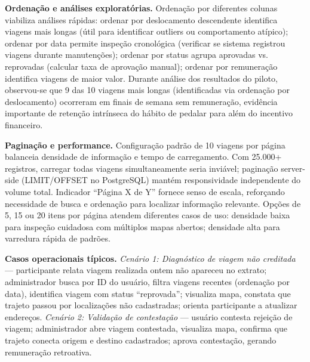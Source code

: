 \textbf{Ordenação e análises exploratórias.} Ordenação por diferentes colunas viabiliza análises rápidas: ordenar por deslocamento descendente identifica viagens mais longas (útil para identificar outliers ou comportamento atípico); ordenar por data permite inspeção cronológica (verificar se sistema registrou viagens durante manutenções); ordenar por status agrupa aprovadas vs. reprovadas (calcular taxa de aprovação manual); ordenar por remuneração identifica viagens de maior valor. Durante análise dos resultados do piloto, observou-se que 9 das 10 viagens mais longas (identificadas via ordenação por deslocamento) ocorreram em finais de semana sem remuneração, evidência importante de retenção intrínseca do hábito de pedalar para além do incentivo financeiro.

\textbf{Paginação e performance.} Configuração padrão de 10 viagens por página balanceia densidade de informação e tempo de carregamento. Com 25.000+ registros, carregar todas viagens simultaneamente seria inviável; paginação server-side (LIMIT/OFFSET no PostgreSQL) mantém responsividade independente do volume total. Indicador ``Página X de Y'' fornece senso de escala, reforçando necessidade de busca e ordenação para localizar informação relevante. Opções de 5, 15 ou 20 itens por página atendem diferentes casos de uso: densidade baixa para inspeção cuidadosa com múltiplos mapas abertos; densidade alta para varredura rápida de padrões.

\textbf{Casos operacionais típicos.} \textit{Cenário 1: Diagnóstico de viagem não creditada} --- participante relata viagem realizada ontem não apareceu no extrato; administrador busca por ID do usuário, filtra viagens recentes (ordenação por data), identifica viagem com status ``reprovada''; visualiza mapa, constata que trajeto passou por localizações não cadastradas; orienta participante a atualizar endereços. \textit{Cenário 2: Validação de contestação} --- usuário contesta rejeição de viagem; administrador abre viagem contestada, visualiza mapa, confirma que trajeto conecta origem e destino cadastrados; aprova contestação, gerando remuneração retroativa.


